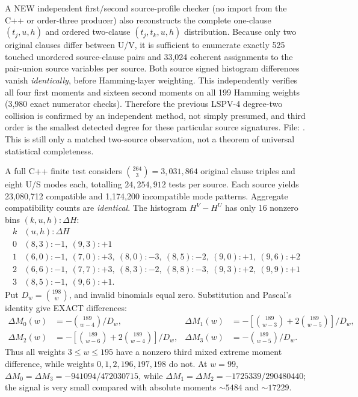 \documentclass[10pt]{article}
\begin{document}
A NEW independent first/second source-profile checker (no import from the C++ or order-three producer) also reconstructs the complete one-clause $(t_j,u,h)$ and ordered two-clause $(t_j,t_k,u,h)$ distribution. Because only two original clauses differ between U/V, it is sufficient to enumerate exactly 525 touched unordered source-clause pairs and 33,024 coherent assignments to the pair-union source variables per source. Both source signed histogram differences vanish \emph{identically}, before Hamming-layer weighting. This independently verifies all four first moments and sixteen second moments on all 199 Hamming weights (3,980 exact numerator checks). Therefore the previous LSPV-4 degree-two collision is confirmed by an independent method, not simply presumed, and third order is the smallest detected degree for these particular source signatures. File: . This is still only a matched two-source observation, not a theorem of universal statistical completeness.

A full C++ finite test considers $\binom{264}{3}=3,031,864$ original clause triples and eight U/S modes each, totalling $24,254,912$ tests per source. Each source yields 23,080,712 compatible and 1,174,200 incompatible mode patterns. Aggregate compatibility counts are \emph{identical}. The histogram $H^V-H^U$ has only 16 nonzero bins $(k,u,h):\Delta H$:
\[
\begin{array}{c|l}
k&(u,h):\Delta H\\\hline
0&(8,3):-1,\ (9,3):+1\\
1&(6,0):-1,\ (7,0):+3,\ (8,0):-3,\ (8,5):-2,\ (9,0):+1,\ (9,6):+2\\
2&(6,6):-1,\ (7,7):+3,\ (8,3):-2,\ (8,8):-3,\ (9,3):+2,\ (9,9):+1\\
3&(8,5):-1,\ (9,6):+1.
\end{array}
\]
Put $D_w=\binom{198}{w}$, and invalid binomials equal zero. Substitution and Pascal's identity give EXACT differences:
\[
\begin{aligned}
\Delta M_0(w)&=-\binom{189}{w-4}/D_w,&
\Delta M_1(w)&=-[\binom{189}{w-3}+2\binom{189}{w-5}]/D_w,\\
\Delta M_2(w)&=-[\binom{189}{w-6}+2\binom{189}{w-4}]/D_w,&
\Delta M_3(w)&=-\binom{189}{w-5}/D_w.
\end{aligned}
\]
Thus all weights $3\le w\le195$ have a nonzero third mixed extreme moment difference, while weights $0,1,2,196,197,198$ do not. At $w=99$, $\Delta M_0=\Delta M_3=-941094/472030715$, while $\Delta M_1=\Delta M_2=-1725339/290480440$; the signal is very small compared with absolute moments $\sim5484$ and $\sim17229$.
\end{document}
